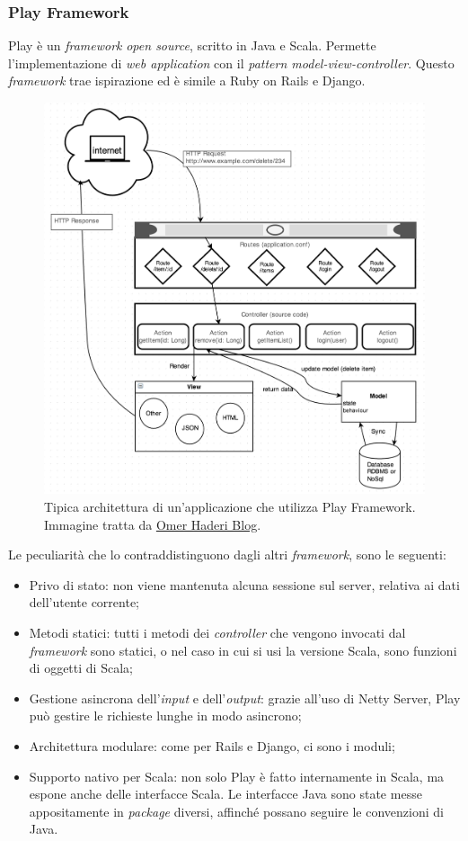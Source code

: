 \subsubsection{Play Framework}
Play è un \emph{framework} \emph{open source}, scritto in Java e Scala. Permette l'implementazione di \emph{web application} con il \emph{pattern model-view-controller}. Questo \emph{framework} trae ispirazione ed è simile a Ruby on Rails e Django.
\begin{figure}[ht]
\centering
\includegraphics[scale=0.5]{immagini/play-arch}
\caption{Tipica architettura di un'applicazione che utilizza Play Framework. Immagine tratta da \href{https://110j.wordpress.com/2013/10/23/play-framework-2-1-architecture/}{Omer Haderi Blog}.}
\label{fig:play-app}
\end{figure}
\newpage
Le peculiarità che lo contraddistinguono dagli altri \emph{framework}, sono le seguenti:
\begin{itemize}
\item Privo di stato: non viene mantenuta alcuna sessione sul server, relativa ai dati dell'utente corrente;
\item Metodi statici: tutti i metodi dei \emph{controller} che vengono invocati dal \emph{framework} sono statici, o nel caso in cui si usi la versione Scala, sono funzioni di oggetti di Scala;
\item Gestione asincrona dell'\emph{input} e dell'\emph{output}: grazie all'uso di Netty Server, Play può gestire le richieste lunghe in modo asincrono;
\item Architettura modulare: come per Rails e Django, ci sono i moduli;
\item Supporto nativo per Scala: non solo Play è fatto internamente in Scala, ma espone anche delle interfacce Scala. Le interfacce Java sono state messe appositamente in \emph{package} diversi, affinché possano seguire le convenzioni di Java.
\end{itemize}
